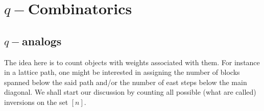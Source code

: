 \chapter{\texorpdfstring{$q-$}-Combinatorics}
\section{\texorpdfstring{$q-$}-analogs}
The idea here is to count objects with weights associated with them. For instance in a lattice path, one might be interested in assigning the number of blocks spanned below the said path and/or the number of east steps below the main diagonal. We shall start our discussion by counting all possible (what are called) inversions on the set $[n]$.

